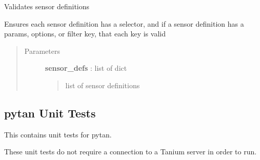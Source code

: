 \documentclass[letterpaper,10pt,english]{sphinxmanual}
\begin{document}
\begin{fulllineitems}
\label{pytan.utils:pytan.utils.val_sensor_defs}
Validates sensor definitions

Ensures each sensor definition has a selector, and if a sensor definition has a params, options, or filter key, that each key is valid
\begin{quote}\begin{description}
\item[{Parameters}] \leavevmode
\textbf{sensor\_defs} : list of dict
\begin{quote}

list of sensor definitions
\end{quote}

\end{description}\end{quote}

\end{fulllineitems}



\subsection{pytan Unit Tests}
\label{pytan.unittest:module-test_pytan_unit}\label{pytan.unittest::doc}\label{pytan.unittest:pytan-unit-tests}
This contains unit tests for pytan.

These unit tests do not require a connection to a Tanium server in order to run.
\end{document}
